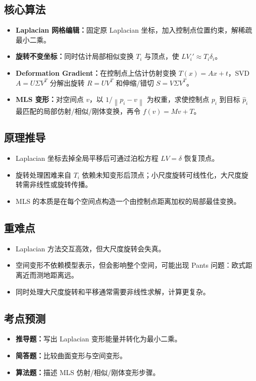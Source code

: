 \documentclass[UTF8,fontset=fandol,11pt]{ctexart}
\newcommand{\key}[1]{\textbf{#1}}
\newcommand{\exam}[1]{\textcolor{blue!55!black}{\textbf{#1}}}
\newcommand{\norm}[1]{\left\lVert #1 \right\rVert}
\begin{document}
\subsection{核心算法}
\begin{itemize}
  \item \key{Laplacian 网格编辑：}固定原 Laplacian 坐标，加入控制点位置约束，解稀疏最小二乘。
  \item \key{旋转不变坐标：}同时估计局部相似变换 $T_i$ 与顶点，使 $LV_i'\approx T_i\delta_i$。
  \item \key{Deformation Gradient：}在控制点上估计仿射变换 $T(x)=Ax+t$，SVD $A=U\Sigma V^T$ 分解出旋转 $R=UV^T$ 和伸缩/错切 $S=V\Sigma V^T$。
  \item \key{MLS 变形：}对空间点 $v$，以 $1/\norm{p_i-v}$ 为权重，求使控制点 $p_i$ 到目标 $\hat p_i$ 最匹配的局部仿射/相似/刚体变换，再令 $f(v)=Mv+T$。
\end{itemize}
\subsection{原理推导}
\begin{itemize}
  \item Laplacian 坐标去掉全局平移后可通过泊松方程 $LV=\delta$ 恢复顶点。
  \item 旋转处理困难来自 $T_i$ 依赖未知变形后顶点；小尺度旋转可线性化，大尺度旋转需非线性或旋转传播。
  \item MLS 的本质是在每个空间点构造一个由控制点距离加权的局部最佳变换。
\end{itemize}
\subsection{重难点}
\begin{itemize}
  \item Laplacian 方法交互高效，但大尺度旋转会失真。
  \item 空间变形不依赖模型表示，但会影响整个空间，可能出现 Pants 问题：欧式距离近而测地距离远。
  \item 同时处理大尺度旋转和平移通常需要非线性求解，计算更复杂。
\end{itemize}
\subsection{考点预测}
\begin{itemize}
  \item \exam{推导题：}写出 Laplacian 变形能量并转化为最小二乘。
  \item \exam{简答题：}比较曲面变形与空间变形。
  \item \exam{算法题：}描述 MLS 仿射/相似/刚体变形步骤。
\end{itemize}
\end{document}
